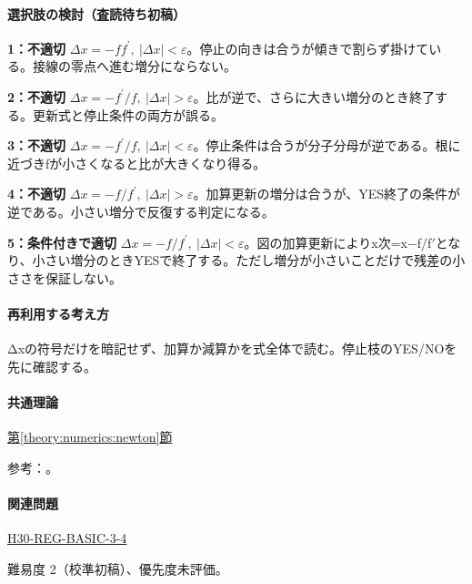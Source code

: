 \paragraph{選択肢の検討（査読待ち初稿）}\mbox{}\par

\noindent\textbf{1：不適切} \(\Delta x=-ff^\prime,\ |\Delta x|<\varepsilon\)。停止の向きは合うが傾きで割らず掛けている。接線の零点へ進む増分にならない。\par

\noindent\textbf{2：不適切} \(\Delta x=-f^\prime/f,\ |\Delta x|>\varepsilon\)。比が逆で、さらに大きい増分のとき終了する。更新式と停止条件の両方が誤る。\par

\noindent\textbf{3：不適切} \(\Delta x=-f^\prime/f,\ |\Delta x|<\varepsilon\)。停止条件は合うが分子分母が逆である。根に近づきfが小さくなると比が大きくなり得る。\par

\noindent\textbf{4：不適切} \(\Delta x=-f/f^\prime,\ |\Delta x|>\varepsilon\)。加算更新の増分は合うが、YES終了の条件が逆である。小さい増分で反復する判定になる。\par

\noindent\textbf{5：条件付きで適切} \(\Delta x=-f/f^\prime,\ |\Delta x|<\varepsilon\)。図の加算更新によりx次=x−f/f\ensuremath{'}となり、小さい増分のときYESで終了する。ただし増分が小さいことだけで残差の小ささを保証しない。\par

\paragraph{再利用する考え方} Δxの符号だけを暗記せず、加算か減算かを式全体で読む。停止枝のYES/NOを先に確認する。

\paragraph{共通理論} \hyperref[theory:numerics:newton]{第\ref*{theory:numerics:newton}節}

\par 参考：\cite{nist_newton}。

\paragraph{関連問題} \hyperref[q:h30-reg-basic-3-4]{H30-REG-BASIC-3-4}

\par 難易度 2（校準初稿）、優先度未評価。


